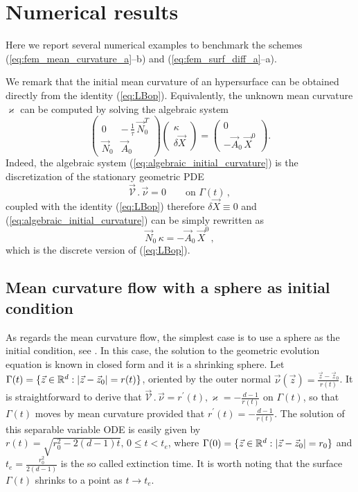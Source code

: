 \section[Numerical results]{Numerical results}
Here we report several numerical examples to benchmark the schemes
(\ref{eq:fem_mean_curvature_a}--b) and (\ref{eq:fem_surf_diff_a}--a).

We remark that the initial mean curvature of an hypersurface can be obtained
directly from the identity (\ref{eq:LBop}). Equivalently, the unknown
mean curvature $\varkappa$ can be computed by solving the algebraic system
\begin{equation}\label{eq:algebraic_initial_curvature}
\begin{pmatrix}
0 & -\,\frac{1}{\tau} \, \vec{N}_{0}^{T} \\
\vec{N}_0 & \vec{A}_0
\end{pmatrix}
\begin{pmatrix}
\kappa \\
\delta \vec X
\end{pmatrix}
=
\begin{pmatrix}
0 \\
- \vec{A}_0 \, \vec{X}^{0}
\end{pmatrix}
.
\end{equation}
Indeed, the algebraic system (\ref{eq:algebraic_initial_curvature}) is the
discretization of the stationary geometric PDE
\begin{equation}
\vec{\mathcal{V}}\,.\,\vec\nu=0\qquad\mbox{on }\Gamma(t)\,,
\end{equation}
coupled with the identity (\ref{eq:LBop}) therefore $\delta\vec X \equiv 0$ and
(\ref{eq:algebraic_initial_curvature}) can be simply rewritten as
\begin{equation}
\vec{N}_0\,\kappa=- \vec{A}_0 \, \vec{X}^{0}\,,
\end{equation}
which is the discrete version of (\ref{eq:LBop}).

\subsection[Mean curvature flow with a sphere as initial condition]
{Mean curvature flow with a sphere as initial condition}
As regards the mean curvature flow, the simplest case is to use a sphere as the
initial condition, see \cite{Ilmanen98}. In this case, the solution to the
geometric evolution equation is known in closed form and it is a shrinking
sphere. Let $\Gamma(t) = \{ \vec z \in {\mathbb R}^d : |\vec z -\vec z_0| = r(t) \}$,
oriented by the outer normal $\vec \nu(\vec{z}) = \frac{\vec z - \vec
z_0}{r(t)}$. It is straightforward to derive that
$\vec{\mathcal{V}}\,.\,\vec\nu = r^{\prime}(t), \varkappa = - \frac{d -
1}{r(t)}$ on $\Gamma(t)$, so that $\Gamma(t)$ moves by mean curvature provided
that $r^{\prime}(t) = - \frac{d - 1}{r(t)}$. The solution of this separable
variable ODE is easily given by $r(t) = \sqrt{r_0^2 - 2(d - 1)t}, \, 0 \leq t <
t_e$, where $\Gamma(0) = \{ \vec z \in {\mathbb R}^d : |\vec z -\vec z_0| = r_0 \}$ and
$t_e=\frac{r_0^2}{2(d - 1)}$ is the so called extinction time. It is worth
noting that the surface $\Gamma(t)$ shrinks to a point as $t \rightarrow t_e$.

